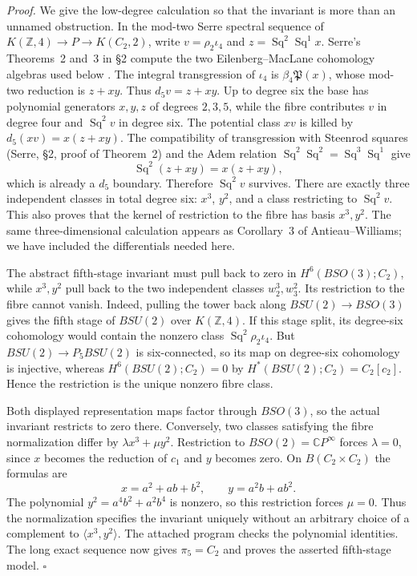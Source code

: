 \emph{Proof.} We give the low-degree calculation so that the invariant is more than an unnamed obstruction. In the mod-two Serre spectral sequence of
$K(\mathbb Z,4)\to P\to K(C_2,2)$, write $v=\rho_2\iota_4$ and $z=\operatorname{Sq}^2\operatorname{Sq}^1x$. Serre's Theorems~2 and~3 in \S2 compute the two Eilenberg--MacLane cohomology algebras used below \cite{Serre1953}. The integral transgression of $\iota_4$ is $\beta_4\mathfrak P(x)$, whose mod-two reduction is $z+xy$. Thus $d_5v=z+xy$. Up to degree six the base has polynomial generators $x,y,z$ of degrees $2,3,5$, while the fibre contributes $v$ in degree four and $\operatorname{Sq}^2v$ in degree six. The potential class $xv$ is killed by $d_5(xv)=x(z+xy)$. The compatibility of transgression with Steenrod squares (Serre, \S2, proof of Theorem~2) and the Adem relation $\operatorname{Sq}^2\operatorname{Sq}^2=\operatorname{Sq}^3\operatorname{Sq}^1$ give
\[
\operatorname{Sq}^2(z+xy)=x(z+xy),
\]
which is already a $d_5$ boundary. Therefore $\operatorname{Sq}^2v$ survives. There are exactly three independent classes in total degree six: $x^3$, $y^2$, and a class restricting to $\operatorname{Sq}^2v$. This also proves that the kernel of restriction to the fibre has basis $x^3,y^2$. The same three-dimensional calculation appears as Corollary~3 of Antieau--Williams; we have included the differentials needed here.

The abstract fifth-stage invariant must pull back to zero in $H^6(BSO(3);C_2)$, while $x^3,y^2$ pull back to the two independent classes $w_2^3,w_3^2$. Its restriction to the fibre cannot vanish. Indeed, pulling the tower back along $BSU(2)\to BSO(3)$ gives the fifth stage of $BSU(2)$ over $K(\mathbb Z,4)$. If this stage split, its degree-six cohomology would contain the nonzero class $\operatorname{Sq}^2\rho_2\iota_4$. But $BSU(2)\to P_5BSU(2)$ is six-connected, so its map on degree-six cohomology is injective, whereas $H^6(BSU(2);C_2)=0$ by $H^*(BSU(2);C_2)=C_2[c_2]$. Hence the restriction is the unique nonzero fibre class.

Both displayed representation maps factor through $BSO(3)$, so the actual invariant restricts to zero there. Conversely, two classes satisfying the fibre normalization differ by $\lambda x^3+\mu y^2$. Restriction to $BSO(2)=\mathbb CP^\infty$ forces $\lambda=0$, since $x$ becomes the reduction of $c_1$ and $y$ becomes zero. On $B(C_2\times C_2)$ the formulas are
\[
x=a^2+ab+b^2,\qquad y=a^2b+ab^2.
\]
The polynomial $y^2=a^4b^2+a^2b^4$ is nonzero, so this restriction forces $\mu=0$. Thus the normalization specifies the invariant uniquely without an arbitrary choice of a complement to $\langle x^3,y^2\rangle$. The attached program checks the polynomial identities. The long exact sequence now gives $\pi_5=C_2$ and proves the asserted fifth-stage model. \hfill$\square$

